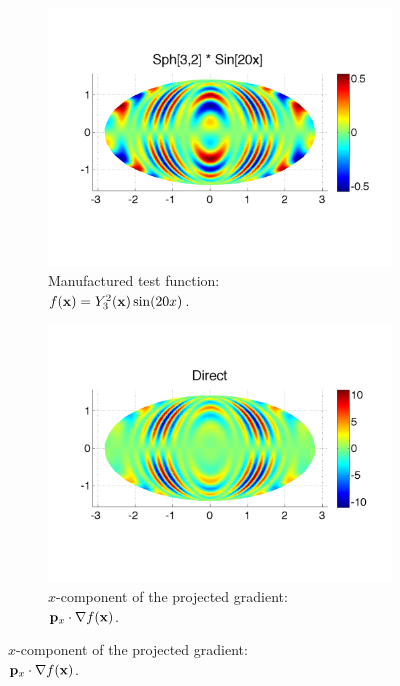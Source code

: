\begin{figure}[htbp]
	\centering
	\begin{subfigure}[b]{0.425\textwidth}
	\includegraphics[width=1.0\textwidth]{figures/chapter2/compare_weight_generation/xsfc_vs_xsfc_alt_on_sph32_times_sine_20x/sph32_times_sin20x.pdf}
	\caption{Manufactured test function: \\  $f(\mathbf{x}) = Y_{3}^{2}(\mathbf{x})\sin(20x)$.  }
	\end{subfigure}
	\begin{subfigure}[b]{0.425\textwidth}
	\includegraphics[width=1.0\textwidth]{figures/chapter2/compare_weight_generation/xsfc_vs_xsfc_alt_on_sph32_times_sine_20x/pdx_sph32_times_sin20x.pdf}
	\caption{$x$-component of the projected gradient: \\  $\mathbf{p}_{x} \cdot \nabla f(\mathbf{x})$.  }
	\end{subfigure}
	

\end{figure}
